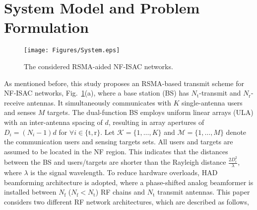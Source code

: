 \documentclass[10pt,journal,twocolumn]{IEEEtran}
\begin{document}
\section{System Model and Problem Formulation}\label{Section II}
\begin{figure}[tbp]
\centering
\texttt{[image: Figures/System.eps]}
\caption{The considered RSMA-aided NF-ISAC networks.}
\label{fig: system}
\end{figure}
As mentioned before, this study proposes an RSMA-based transmit scheme for NF-ISAC networks,  Fig.~\ref{fig: system}(a), where a base station (BS) has $N_{\text{t}}$-transmit and $N_{\text{r}}$-receive antennas. It simultaneously communicates with $K$ single-antenna users and senses $M$ targets. The dual-function BS employs uniform linear arrays (ULA) with an inter-antenna spacing of $d$, resulting in array apertures of $D_i=(N_i-1)d$ for $\forall i\in\{\text{t},\text{r}\}$.  Let $\mathcal{K}=\{1,\dots, K\}$ and $\mathcal{M}=\{1,\dots, M\}$ denote the communication users and sensing targets sets. All users and targets are assumed to be located in the NF region. This indicates that the distances between the BS and users/targets are shorter than the Rayleigh distance $\frac{2D^2_i}{\lambda}$, where $\lambda$ is the signal wavelength. To reduce hardware overloads, HAD beamforming architecture is adopted, where a phase-shifted analog beamformer is installed between $N_{\text{f}}$ ($N_{\text{f}}<N_{\text{t}}$) RF chains and $N_{\text{t}}$ transmit antennas. This paper considers two different RF network architectures, which are described as follows,
\end{document}
